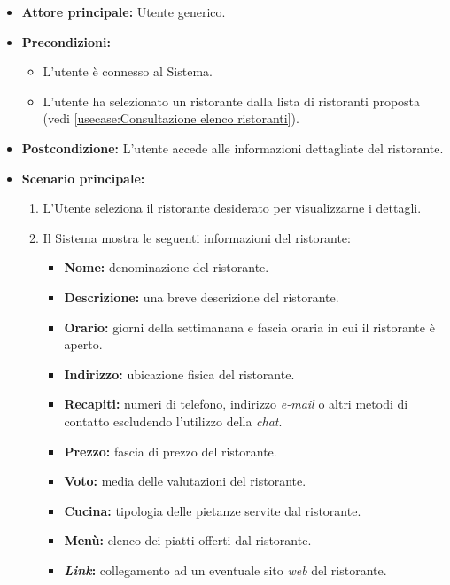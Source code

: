 \label{usecase:Visualizzazione di un ristorante}
\begin{itemize}
	\item \textbf{Attore principale:} Utente generico.


	\item \textbf{Precondizioni:}
	\begin{itemize}
        \item L'utente è connesso al Sistema.
        \item L'utente ha selezionato un ristorante dalla lista di ristoranti proposta (vedi \autoref{usecase:Consultazione elenco ristoranti}).
    \end{itemize}

	\item \textbf{Postcondizione:} L'utente accede alle informazioni dettagliate del ristorante.

	\item \textbf{Scenario principale:}
		\begin{enumerate}
		    \item L'Utente seleziona il ristorante desiderato per visualizzarne i dettagli.
		    \item Il Sistema mostra le seguenti informazioni del ristorante:
		    \begin{itemize}
				\item \textbf{Nome:} denominazione del ristorante.
				\item \textbf{Descrizione:} una breve descrizione del ristorante.
				\item \textbf{Orario:} giorni della settimanana e fascia oraria in cui il ristorante è aperto.
				\item \textbf{Indirizzo:} ubicazione fisica del ristorante.
				\item \textbf{Recapiti:} numeri di telefono, indirizzo \textit{e-mail} o altri metodi di contatto escludendo l'utilizzo della \textit{chat}.
				\item \textbf{Prezzo:} fascia di prezzo del ristorante.
				\item \textbf{Voto:} media delle valutazioni del ristorante.
				\item \textbf{Cucina:} tipologia delle pietanze servite dal ristorante.
				\item \textbf{Menù:} elenco dei piatti offerti dal ristorante.
				\item \textbf{\textit{Link}:} collegamento ad un eventuale sito \textit{web} del ristorante. 
			\end{itemize}
	    \end{enumerate}

\end{itemize}